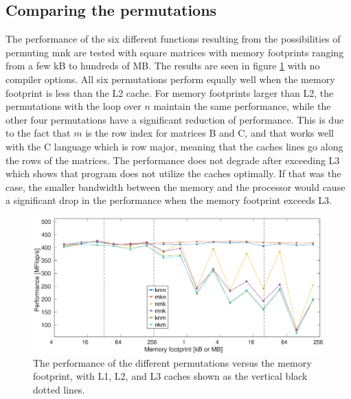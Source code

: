 \subsection{Comparing the permutations}
The performance of the six different functions resulting from the possibilities of permuting mnk are tested with square matrices with memory footprints ranging from a few kB to hundreds of MB. The results are seen in figure \ref{fig:permGraph_none} with no compiler options. All six permutations perform equally well when the memory footprint is less than the L2 cache. For memory footprints larger than L2, the permutations with the loop over $n$ maintain the same performance, while the other four permutations have a significant reduction of performance. This is due to the fact that $m$ is the row index for matrices B and C, and that works well with the C language which is row major, meaning that the caches lines go along the rows of the matrices. The performance does not degrade after exceeding L3 which shows that program does not utilize the caches optimally. If that was the case, the smaller bandwidth between the memory and the processor would cause a significant drop in the performance when the memory footprint exceeds L3.
\begin{figure}
\centering
\includegraphics[width = 1.1\textwidth]{fig/permGraph_none.eps}
\caption{The performance of the different permutations versus the memory footprint, with L1, L2, and L3 caches shown as the vertical black dotted lines.}
\label{fig:permGraph_none}
\end{figure}
